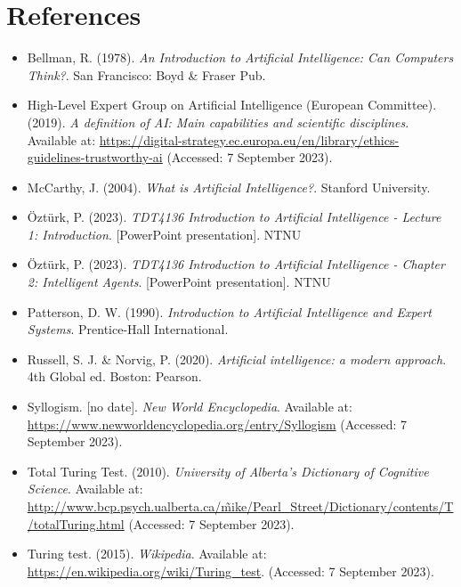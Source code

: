 \documentclass{article}
\begin{document}
\section*{References}
\begin{itemize}
    \item {Bellman, R. (1978). \textit{An Introduction to Artificial Intelligence: Can Computers Think?}. San Francisco: Boyd \& Fraser Pub.}
    \item{High-Level Expert Group on Artificial Intelligence (European Committee). (2019). \textit{A definition of AI: Main capabilities and scientific disciplines}. Available at: \href{https://digital-strategy.ec.europa.eu/en/library/ethics-guidelines-trustworthy-ai}{https://digital-strategy.ec.europa.eu/en/library/ethics-guidelines-trustworthy-ai} (Accessed: 7 September 2023).}
    \item{McCarthy, J. (2004). \textit{What is Artificial Intelligence?}. Stanford University.}
    \item{Öztürk, P. (2023). \textit{TDT4136 Introduction to Artificial Intelligence - Lecture 1: Introduction}. [PowerPoint presentation]. NTNU}
    \item{Öztürk, P. (2023). \textit{TDT4136 Introduction to Artificial Intelligence - Chapter 2: Intelligent Agents}. [PowerPoint presentation]. NTNU}
    \item{Patterson, D. W. (1990). \textit{Introduction to Artificial Intelligence and Expert Systems}. Prentice-Hall International.}
    \item{Russell, S. J. \& Norvig, P. (2020). \textit{Artificial intelligence: a modern approach}. 4th Global ed. Boston: Pearson.}
    \item{Syllogism. [no date]. \textit{New World Encyclopedia}. Available at:\\ \href{https://www.newworldencyclopedia.org/entry/Syllogism}{https://www.newworldencyclopedia.org/entry/Syllogism} (Accessed: 7 September 2023).}
    \item{Total Turing Test. (2010). \textit{University of Alberta's Dictionary of Cognitive Science}. Available at: \href{http://www.bcp.psych.ualberta.ca/~mike/Pearl_Street/Dictionary/contents/T/totalTuring.html}{http://www.bcp.psych.ualberta.ca/\~mike/Pearl\_Street/Dictionary/contents/T/totalTuring.html} (Accessed: 7 September 2023).}
    \item{Turing test. (2015). \textit{Wikipedia}. Available at: \href{https://en.wikipedia.org/wiki/Turing_test}{ https://en.wikipedia.org/wiki/Turing\_test}. (Accessed: 7 September 2023).}
\end{itemize}
\end{document}
